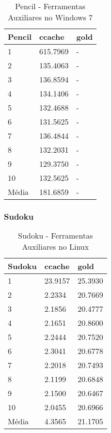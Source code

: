 \begin{table}[!ht]
\centering
\caption{Pencil - Ferramentas Auxiliares no Windows 7}
\label{tab:ferramentas_auxliares:windows:pencil}
\begin{tabular}{lll}
\textbf{Pencil} & \textbf{ccache} &  \textbf{gold}  \\ \toprule
1        & 615.7969  &  -    \\ 
2        & 135.4063  &  -    \\ 
3        & 136.8594  &  -    \\ 
4        & 134.1406  &  -    \\ 
5        & 132.4688  &  -    \\ 
6        & 131.5625  &  -    \\ 
7        & 136.4844  &  -    \\ 
8        & 132.2031  &  -    \\ 
9        & 129.3750  &  -    \\ 
10       & 132.5625  &  -    \\ \bottomrule
Média    & 181.6859  &  -    \\ 
\end{tabular}
\end{table}

\clearpage
\subsubsection*{Sudoku}

\begin{table}[!ht]
\centering
\caption{Sudoku - Ferramentas Auxiliares no Linux}
\label{tab:ferramentas_auxliares:linux:sudoku}
\begin{tabular}{lll}
\textbf{Sudoku} & \textbf{ccache} &  \textbf{gold}  \\ \toprule
1          & 23.9157 & 25.3930  \\ 
2          & 2.2334  & 20.7669  \\ 
3          & 2.1856  & 20.4777  \\ 
4          & 2.1651  & 20.8600  \\ 
5          & 2.2444  & 20.7520  \\ 
6          & 2.3041  & 20.6778  \\ 
7          & 2.2018  & 20.7493  \\ 
8          & 2.1199  & 20.6848  \\ 
9          & 2.1500  & 20.6467  \\ 
10         & 2.0455  & 20.6966  \\ \bottomrule
Média      & 4.3565  & 21.1705  \\ 
\end{tabular}
\end{table}

